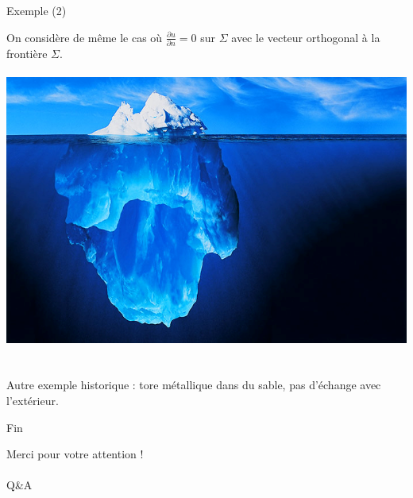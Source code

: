 \documentclass[10pt]{beamer}
\begin{document}
\begin{frame}{Exemple (2)}

On considère de même le cas où $\frac{\partial u}{\partial n}=0$ sur $\Sigma$ avec le vecteur orthogonal à la frontière $\Sigma$. \\~\\


\includegraphics[scale=0.25]{iceberg.png}
 ~ \\~\\

Autre exemple historique : tore métallique dans du sable, pas d'échange avec l'extérieur.
\end{frame}



\begin{frame}{Fin}

\begin{center}
Merci pour votre attention ! \\~\\
Q\&A
\end{center}

\end{frame}
\end{document}
